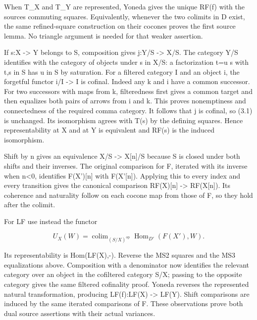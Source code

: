 When T\_\allowbreak{}X and T\_\allowbreak{}Y are represented,\allowbreak{} Yoneda gives the unique RF(f)\allowbreak{} with the source\textquotesingle s commuting squares. Equivalently,\allowbreak{} whenever the two colimits in D\textquotesingle{} exist,\allowbreak{} the same refined-square construction on their cocones proves the first source lemma. No triangle argument is needed for that weaker assertion.

If s:\allowbreak{}X \allowbreak{}-> Y belongs to S,\allowbreak{} composition gives j:\allowbreak{}Y/\allowbreak{}S \allowbreak{}-> X/\allowbreak{}S. The category Y/\allowbreak{}S identifies with the category of objects under s in X/\allowbreak{}S:\allowbreak{} a factorization t\allowbreak{}=u s with t,\allowbreak{}s in S has u in S by saturation. For a filtered category I and an object i,\allowbreak{} the forgetful functor i/\allowbreak{}I \allowbreak{}-> I is cofinal. Indeed any k and i have a common successor. For two successors with maps from k,\allowbreak{} filteredness first gives a common target and then equalizes both pairs of arrows from i and k. This proves nonemptiness and connectedness of the required comma category. It follows that j is cofinal,\allowbreak{} so (3.1)\allowbreak{} is unchanged. Its isomorphism agrees with T(s)\allowbreak{} by the defining squares. Hence representability at X and at Y is equivalent and RF(s)\allowbreak{} is the induced isomorphism.

Shift by n gives an equivalence X/\allowbreak{}S \allowbreak{}-> X[n]\allowbreak{}/\allowbreak{}S because S is closed under both shifts and their inverses. The original comparison for F,\allowbreak{} iterated with its inverse when n<0,\allowbreak{} identifies F(X')\allowbreak{}[n]\allowbreak{} with F(X'[n]\allowbreak{})\allowbreak{}. Applying this to every index and every transition gives the canonical comparison RF(X)\allowbreak{}[n]\allowbreak{} \allowbreak{}-> RF(X[n]\allowbreak{})\allowbreak{}. Its coherence and naturality follow on each cocone map from those of F,\allowbreak{} so they hold after the colimit.

For LF use instead the functor

\[
 U_X(W)=\mathop{\operatorname{colim}}_{(S/X)^{\mathrm{op}}}
                         \operatorname{Hom}_{D'}(F(X'),W).
\]

Its representability is Hom(LF(X)\allowbreak{},\allowbreak{}-)\allowbreak{}. Reverse the MS2 squares and the MS3 equalizations above. Composition with a denominator now identifies the relevant category over an object in the cofiltered category S/\allowbreak{}X; passing to the opposite category gives the same filtered cofinality proof. Yoneda reverses the represented natural transformation,\allowbreak{} producing LF(f)\allowbreak{}:\allowbreak{}LF(X)\allowbreak{} \allowbreak{}-> LF(Y)\allowbreak{}. Shift comparisons are induced by the same iterated comparisons of F. These observations prove both dual source assertions with their actual variances.

